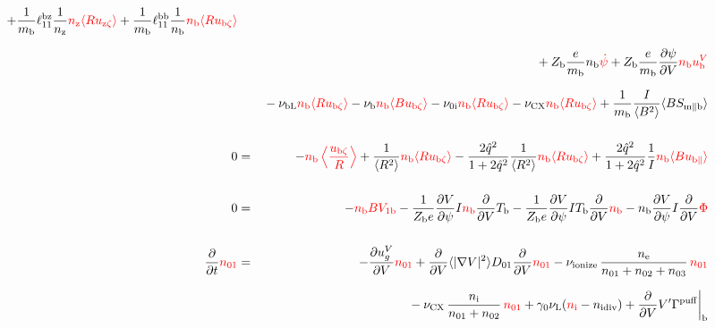\documentclass[11pt]{article}
\def\r#1{{\rm#1}}
\def\ave#1{\left\langle#1\right\rangle}
\def\aves#1{\langle#1\rangle}
\def\dd#1#2{\frac{\partial #1}{\partial #2}}
\def\para{\parallel}
\def\ddV{\frac{\partial}{\partial V}}
\def\ddt{\frac{\partial}{\partial t}}
\def\mi{m_\r{i}}
\def\mb{m_\r{b}}
\def\nee{n_\r{e}}
\def\ni{n_\r{i}}
\def\nz{n_\r{z}}
\def\nb{n_\r{b}}
\def\Te{T_\r{e}}
\def\Tb{T_\r{b}}
\def\Zi{Z_\r{i}}
\def\Zb{Z_\r{b}}
\def\uzt#1{u_{\r{#1}\zeta}}
\def\upara#1{u_{\r{#1}\para}}
\def\qhatpara#1{\hat{q}_{\r{#1}\para}}
\def\uV#1{u_\r{#1}^V}
\def\ugV{u_{g}^V}
\def\De{D_\r{e}}
\def\nun#1{\nu_\r{0#1}}
\def\ndiv#1{n_\r{#1div}}
\def\bri{\aves{B^2}\aves{R^2} - I^2}
\def\nna{n_{01}}
\def\nnb{n_{02}}
\def\nnc{n_{03}}
\def\nuL{\nu_\r{L}}
\def\nuCX{\nu_\r{CX}}
\def\nuion{\nu_\r{ionize}}
\def\nub{\nu_\r{b}}
\def\nuOL{\nu_\r{OL}}
\def\nubL{\nu_\r{bL}}
\def\red#1{\textcolor{red}{#1}}
\begin{document}
\begin{eqnarray}
  + \frac{1}{\mb} \ell_{11}^\r{bz} \frac{1}{\nz}  \red{\nz  \aves{R \uzt{z}}}
  + \frac{1}{\mb} \ell_{11}^\r{bb} \frac{1}{\nb}  \red{\nb  \aves{R \uzt{b}}}
\nonumber\\[2.5mm]&&{}
%
%
  + \Zb \frac{e}{\mb}              \nb \red{\dot{\psi}}
%
  + \Zb \frac{e}{\mb} \dd{\psi}{V} \red{\nb \uV{b}}
%
\nonumber\\[2.5mm]&&{}
%
  - \nubL  \red{\nb \aves{R \uzt{b}}}
%
  - \nub  \red{\nb \aves{B \uzt{b}}}
%
  - \nun{i} \red{\nb \aves{R \uzt{b}}}
%
  - \nuCX \red{\nb \aves{R \uzt{b}}}
%
%
  + \frac{1}{\mb} \frac{I}{\aves{B^2}} \aves{B S_{\r{m}\para\r{b}}}
%
\\[5mm]
  0 &=&
%
  - \red{\nb \ave{\frac{\uzt{b}}{R}}}
%
  + \frac{1}{\aves{R^2}} \red{\nb \aves{R\uzt{b}}}
%
  - \frac{2\hat{q}^2}{1+2\hat{q}^2} \frac{1}{\aves{R^2}}\red{\nb\aves{R\uzt{b}}}
%
  + \frac{2\hat{q}^2}{1+2\hat{q}^2} \frac{1}{I}\red{\nb \aves{B\upara{b}}}
\\[5mm]
    0 &=&
%
  - \red{\nb BV_{1\r{b}}}
%
  - \frac{1}{\Zb e} \dd{V}{\psi} I \red{\nb} \ddV \Tb 
%
  - \frac{1}{\Zb e} \dd{V}{\psi} I \Tb \ddV \red{\nb}
%
  - \nb \dd{V}{\psi} I \ddV \red{\Phi}
\\[5mm]
  \ddt \red{\nna} &=& 
%
  - \dd{\ugV}{V} \red{\nna}
%
  + \ddV \aves{|\nabla V|^2} D_{01} \ddV \red{\nna}
%
  - \nuion\, \frac{\nee}{\nna + \nnb + \nnc}\, \red{\nna}
%
\nonumber\\[2.5mm]&&{}
  - \nuCX\, \frac{\ni}{\nna + \nnb}\, \red{\nna}
%
  + \gamma_0 \nuL (\red{\ni} - \ndiv{i})
%
  + \ddV V' \Gamma^\r{puff}\biggr|_\r{b}
\\[5mm]

\end{eqnarray}
\end{document}
